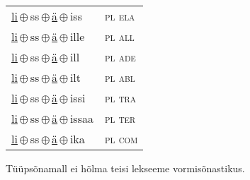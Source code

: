\begin{minipage}{\textwidth}
\begin{sideways}
\begin{tabular}{l l}
\underline{li}\,$\oplus$\,ss\,$\oplus$\,\underline{ä}\,$\oplus$\,iss & \textsc{ pl ela } \\
\underline{li}\,$\oplus$\,ss\,$\oplus$\,\underline{ä}\,$\oplus$\,ille & \textsc{ pl all } \\
\underline{li}\,$\oplus$\,ss\,$\oplus$\,\underline{ä}\,$\oplus$\,ill & \textsc{ pl ade } \\
\underline{li}\,$\oplus$\,ss\,$\oplus$\,\underline{ä}\,$\oplus$\,ilt & \textsc{ pl abl } \\
\underline{li}\,$\oplus$\,ss\,$\oplus$\,\underline{ä}\,$\oplus$\,issi & \textsc{ pl tra } \\
\underline{li}\,$\oplus$\,ss\,$\oplus$\,\underline{ä}\,$\oplus$\,issaa & \textsc{ pl ter } \\
\underline{li}\,$\oplus$\,ss\,$\oplus$\,\underline{ä}\,$\oplus$\,ika & \textsc{ pl com } \\
\end{tabular}
\end{sideways}
\label{tab:tüüpsõnamall-lisä}

\end{minipage}

 
\vspace{1em}
\noindent Tüüpsõnamall  ei hõlma teisi lekseeme vormi\-sõnastikus.
